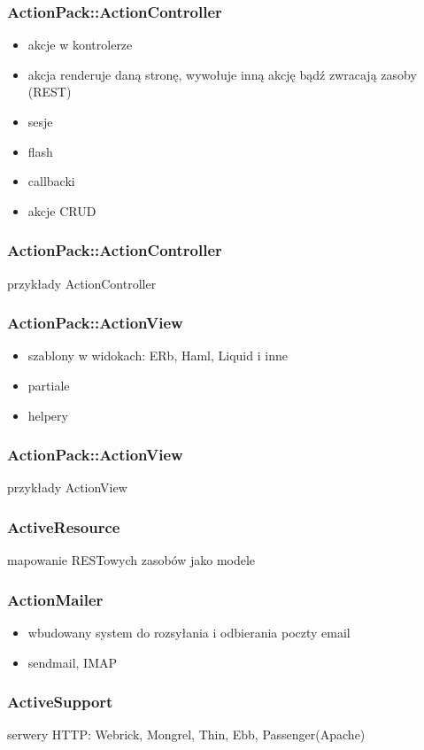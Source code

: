 \documentclass[12t]{beamer}
\begin{document}
\begin{frame}
  \frametitle{ActionPack::ActionController}
  \begin{itemize}
  \item akcje w kontrolerze
  \item akcja renderuje daną stronę, wywołuje inną akcję bądź zwracają zasoby (REST)
  \item sesje
  \item flash
  \item callbacki
  \item akcje CRUD
  \end{itemize}
\end{frame}

\begin{frame}
  \frametitle{ActionPack::ActionController}
  przykłady ActionController
\end{frame}

\begin{frame}
  \frametitle{ActionPack::ActionView}
  \begin{itemize}
  \item szablony w widokach: ERb, Haml, Liquid i inne
  \item partiale
  \item helpery
  \end{itemize}
\end{frame}

\begin{frame}
  \frametitle{ActionPack::ActionView}
  przykłady ActionView
\end{frame}

\begin{frame}
  \frametitle{ActiveResource}
  mapowanie RESTowych zasobów jako modele
\end{frame}

\begin{frame}
  \frametitle{ActionMailer}
  \begin{itemize}
  \item wbudowany system do rozsyłania i odbierania poczty email
  \item sendmail, IMAP
  \end{itemize}
\end{frame}

\begin{frame}
  \frametitle{ActiveSupport}
\end{frame}

\begin{frame}
  serwery HTTP: Webrick, Mongrel, Thin, Ebb, Passenger(Apache)
\end{frame}
\end{document}
